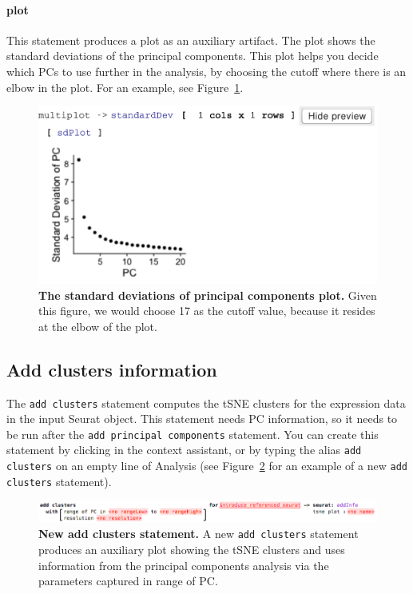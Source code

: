 \paragraph{plot} This statement produces a plot as an auxiliary artifact. The plot shows the
standard deviations of the principal components. This plot helps you decide which PCs to use
further in the analysis, by choosing the cutoff where there is an elbow in the plot. For
an example, see Figure~\ref{fig:ElbowView}.

\begin{figure}
  \centering
    \includegraphics[width=\figWidthNarrow]{figures/ElbowView.pdf}
    \caption[The standard deviations of principal components plot.]{\textbf{The standard deviations of
    principal components plot.} Given this figure, we would choose 17 as the cutoff value,
    because it resides at the elbow of the plot.}
\label{fig:ElbowView}
\end{figure}

\subsection{Add clusters information}
The \texttt{add clusters} statement computes the tSNE clusters for the expression
data in the input Seurat object. This statement needs PC information, so it needs to be
run after the \texttt{add principal components} statement. You can create this statement by clicking
 in the context assistant, or by typing
the alias \texttt{add clusters} on an empty line of Analysis (see Figure~\ref{fig:AddClusters}
for an example of a new \texttt{add clusters} statement).

\begin{figure}[h!tbp]
  \centering
    \includegraphics[width=\figWidthWide]{figures/AddClusters.png}
    \caption[New add clusters statement.]{\textbf{New add clusters statement.} A new
    \texttt{add clusters} statement produces an auxiliary plot showing the tSNE clusters
    and uses information from the principal components analysis via the parameters captured
    in range of PC.}
\label{fig:AddClusters}
\end{figure}

